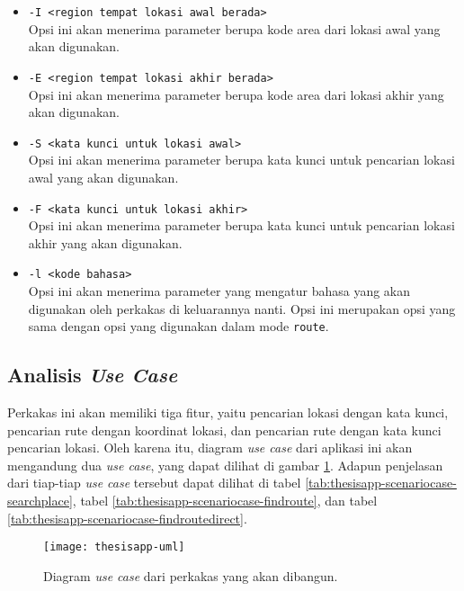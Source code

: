 \begin{itemize}
\begin{itemize}
		\begin{itemize}
			\item \verb|-I <region tempat lokasi awal berada>|\\
			Opsi ini akan menerima parameter berupa kode area dari lokasi awal yang akan digunakan.
			\item \verb|-E <region tempat lokasi akhir berada>|\\
			Opsi ini akan menerima parameter berupa kode area dari lokasi akhir yang akan digunakan.
			\item \verb|-S <kata kunci untuk lokasi awal>|\\
			Opsi ini akan menerima parameter berupa kata kunci untuk pencarian lokasi awal yang akan digunakan.
			\item \verb|-F <kata kunci untuk lokasi akhir>|\\
			Opsi ini akan menerima parameter berupa kata kunci untuk pencarian lokasi akhir yang akan digunakan.
			\item \verb|-l <kode bahasa>|\\
			Opsi ini akan menerima parameter yang mengatur bahasa yang akan digunakan oleh perkakas di keluarannya nanti. Opsi ini merupakan opsi yang sama dengan opsi yang digunakan dalam mode \verb|route|.
		\end{itemize}
		
	\end{itemize}
	
\end{itemize}

\subsection{Analisis \textit{Use Case}}
\label{sec:analysis-thesisapp-usecases}

Perkakas \cl ini akan memiliki tiga fitur, yaitu pencarian lokasi dengan kata kunci, pencarian rute dengan koordinat \latlon lokasi, dan pencarian rute dengan kata kunci pencarian lokasi. Oleh karena itu, diagram \textit{use case} dari aplikasi ini akan mengandung dua \textit{use case}, yang dapat dilihat di gambar \ref{fig:thesisapp-uml}. Adapun penjelasan dari tiap-tiap \textit{use case} tersebut dapat dilihat di tabel \ref{tab:thesisapp-scenariocase-searchplace}, tabel \ref{tab:thesisapp-scenariocase-findroute}, dan tabel \ref{tab:thesisapp-scenariocase-findroutedirect}.

\begin{figure}[ht]
    \centering
    \texttt{[image: thesisapp-uml]}
    \caption[Diagram \textit{use case} perkakas yang akan dibangun]{Diagram \textit{use case} dari perkakas yang akan dibangun.}
    \label{fig:thesisapp-uml}
\end{figure}

